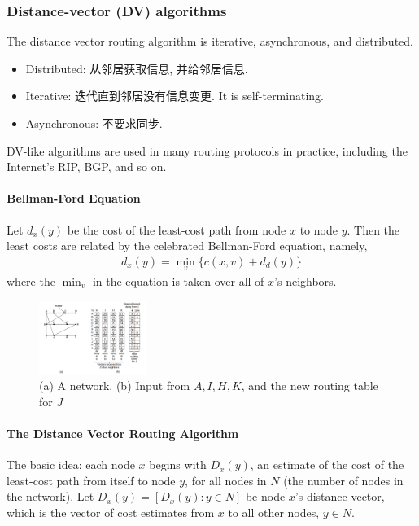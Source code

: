 \subsubsection{Distance-vector (DV) algorithms}
The distance vector routing algorithm is iterative, asynchronous, and distributed. 
\begin{itemize}
    \item Distributed: 从邻居获取信息, 并给邻居信息. 
    \item Iterative: 迭代直到邻居没有信息变更. It is self-terminating. 
    \item Asynchronous: 不要求同步. 
\end{itemize}
DV-like algorithms are used in many routing protocols in practice, including the Internet's RIP, BGP, and so on.

\paragraph{Bellman-Ford Equation}
Let $d_x(y)$ be the cost of the least-cost path from node $x$ to node $y$. Then the least costs are related by the celebrated Bellman-Ford equation, namely,
\begin{align*}
    d_x(y)=\min_v\{ c(x,v)+d_d(y) \}
\end{align*}
where the $\min_v$ in the equation is taken over all of $x$'s neighbors.

\begin{figure}[!htb]
    \centering
    \includegraphics[width=0.309\textwidth]{pic/CN5/Bellman-Ford}
    \caption{(a) A network. (b) Input from $A, I, H, K$, and the new routing table for $J$}
\end{figure}

\paragraph{The Distance Vector Routing Algorithm}
The basic idea: each node $x$ begins with $D_x(y)$, an estimate of the cost of the least-cost path from itself to node $y$, for all nodes in $N$ (the number of nodes in the network). Let $D_x(y) = [D_x(y) : y \in N]$ be node $x$'s distance vector, which is the vector of cost estimates from $x$ to all other nodes, $y \in N$.

